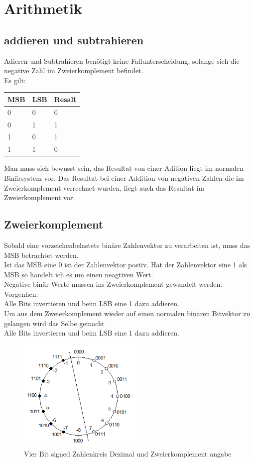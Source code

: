 \section{Arithmetik}
\subsection{addieren und subtrahieren}
Adieren und Subtrahieren benötigt keine Fallunterscheidung, solange sich die 
negative Zahl im Zweierkomplement befindet.\\
Es gilt:\\
\begin{table}[h]
\begin{tabular}{ll|l}

MSB & LSB & Resalt \\ \hline
0   & 0   & 0      \\ 
0   & 1   & 1      \\ 
1   & 0   & 1      \\ 
1   & 1   & 0      \\ 
\end{tabular}
\end{table}

\noindent Man muss sich bewusst sein, das Resultat von einer Adition liegt im 
normalen Binärsystem vor. Das Resultat bei einer Addition von negativen Zahlen 
die im Zweierkomplement verrechnet wurden, liegt auch das Resultat im 
Zweierkomplement vor.

\subsection{Zweierkomplement}
Sobald eine vorzeichenbelastete binäre Zahlenvektor zu verarbeiten ist, muss 
das MSB betrachtet werden.\\
Ist das MSB eine 0 ist der Zahlenvektor postiv. Hat der Zahlenvektor eine 1 
als MSB so handelt ich es um einen neagtiven Wert.
\\
Negative binär Werte mussen ins Zweierkomplement gewandelt werden.\\
Vorgenhen:\\
Alle Bits invertieren und beim LSB eine 1 dazu addieren.
\\
Um aus dem Zweierkomplement wieder auf einen normalen binären Bitvektor zu 
gelangen wird das Selbe gemacht\\
Alle Bits invertieren und beim LSB eine 1 dazu addieren.
\begin{figure}[htbp]
	\centering
		\includegraphics[width=6cm]{content/bilder/Zahlenkreis.png}
	\caption{Vier Bit signed Zahlenkreis Dezimal und Zweierkomplement angabe}%
	\label{Zahlenkreis}
\end{figure}


